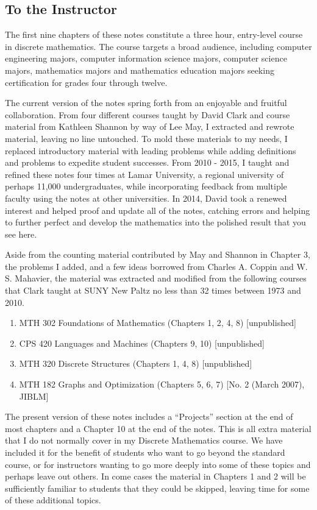 \begin{annotation}
\chapter{To the Instructor}

The first nine chapters of these notes constitute a three hour, entry-level course in discrete mathematics.  The course targets a broad audience, including computer engineering majors, computer information science majors, computer science majors, mathematics majors and mathematics education majors seeking certification for grades four through twelve.

The current version of the notes spring forth from an enjoyable and fruitful collaboration.  From four different courses taught by David Clark and course material from Kathleen Shannon by way of Lee May, I extracted and rewrote material, leaving no line untouched.  To mold these materials to my needs, I replaced introductory material with leading problems while adding definitions and problems to expedite student successes.  From 2010 - 2015, I taught and refined these notes four times at Lamar University, a regional university of perhaps 11,000 undergraduates, while incorporating feedback from multiple faculty using the notes at other universities.  In 2014, David took a renewed interest and helped proof and update all of the notes, catching errors and helping to further perfect and develop the mathematics into the polished result that you see here.

Aside from the counting material contributed by May and Shannon in Chapter 3, the problems I added, and a few ideas borrowed from Charles A. Coppin and W. S. Mahavier, the material was extracted and modified from the following courses that Clark taught at SUNY New Paltz no less than 32 times between 1973 and 2010.
\begin{enumerate}
\item  MTH 302 Foundations of Mathematics (Chapters 1, 2, 4, 8) [unpublished]
\item  CPS 420 Languages and Machines (Chapters 9, 10) [unpublished]
\item  MTH 320 Discrete Structures (Chapters 1, 4, 8) [unpublished]
\item  MTH 182 Graphs and Optimization (Chapters 5, 6, 7)  [No. 2 (March 2007), JIBLM]
\end{enumerate}

The present version of these notes includes a ``Projects'' section at the end of most chapters and a Chapter 10 at the end of the notes.  This is all extra material that I do not normally cover in my Discrete Mathematics course.  We have included it for the benefit of students who want to go beyond the standard course, or for instructors wanting to go more deeply into some of these topics and perhaps leave out others.  In come cases the material in Chapters 1 and 2 will be sufficiently familiar to students that they could be skipped, leaving time for some of these additional topics.


\end{annotation}
